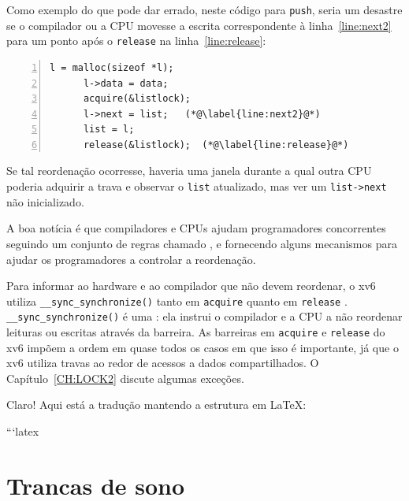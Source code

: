Como exemplo do que pode dar errado,
neste código para
\lstinline{push},
seria um desastre se o compilador ou a CPU movesse a
escrita correspondente à
linha~\ref{line:next2} para um ponto após o
\lstinline{release}
na linha~\ref{line:release}:
\begin{lstlisting}[numbers=left,firstnumber=1]
      l = malloc(sizeof *l);
      l->data = data;
      acquire(&listlock);
      l->next = list;   (*@\label{line:next2}@*)
      list = l;      
      release(&listlock);  (*@\label{line:release}@*)
\end{lstlisting}
Se tal reordenação ocorresse, haveria uma janela durante a qual outra CPU
poderia adquirir a trava e
observar o \lstinline{list} atualizado,
mas ver um \lstinline{list->next} não inicializado.

A boa notícia é que compiladores e CPUs ajudam programadores concorrentes
seguindo um conjunto de regras chamado , e
fornecendo alguns mecanismos para ajudar os programadores a controlar a reordenação.

Para informar ao hardware e ao compilador que não devem reordenar,
o xv6 utiliza
\lstinline{__sync_synchronize()} 
tanto em
\lstinline{acquire} 
quanto em
\lstinline{release} .
\lstinline{__sync_synchronize()}
é uma :
ela instrui o compilador e a CPU a não reordenar leituras ou escritas através da
barreira.
As barreiras em 
\lstinline{acquire}
e
\lstinline{release}
do xv6 impõem a ordem em quase todos os casos em que isso é importante,
já que o xv6 utiliza travas ao redor de acessos a dados compartilhados.
O Capítulo~\ref{CH:LOCK2} discute algumas exceções.

Claro! Aqui está a tradução mantendo a estrutura em LaTeX:

```latex
\section{Trancas de sono}


